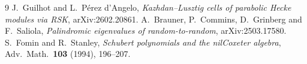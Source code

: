 \documentclass[11pt]{article}
\theoremstyle{definition}
\begin{document}
\begin{thebibliography}{9}
 J.~Guilhot and L.~P\'erez d'Angelo, \emph{Kazhdan--Lusztig cells of parabolic Hecke modules via RSK}, arXiv:2602.20861.
 A.~Brauner, P.~Commins, D.~Grinberg and F.~Saliola, \emph{Palindromic eigenvalues of random-to-random}, arXiv:2503.17580.
 S.~Fomin and R.~Stanley, \emph{Schubert polynomials and the nilCoxeter algebra}, Adv.\ Math.\ \textbf{103} (1994), 196--207.
\end{thebibliography}
\end{document}
